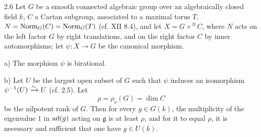 \begin{theorem}{2.6}\label{XIII.2.6}
Let $G$ be a smooth connected algebraic group over an algebraically closed
field $k$, $C$ a Cartan subgroup, associated to a maximal torus $T$,
$N=\operatorname{Norm}_G(C)=\operatorname{Norm}_G(T)$ (cf. XII 8.4), and let $X=G\times^N C$, where
$N$ acts on the left factor $G$ by right translations, and on the right
factor $C$ by inner automorphisms; let $\psi:X\to G$ be the canonical
morphism.

\noindent a) The morphism $\psi$ is birational.

\noindent b) Let $U$ be the largest open subset of $G$ such that $\psi$
induces an isomorphism $\psi^{-1}(U)\xrightarrow{\sim} U$ (cf. 2.5). Let
\[
 \rho=\rho_\nu(G)=\dim C
\]
be the nilpotent rank of $G$. Then for every $g\in G(k)$, the multiplicity
of the eigenvalue $1$ in $\operatorname{ad}(g)$ acting on $\mathfrak g$ is at least
$\rho$, and for it to equal $\rho$, it is necessary and sufficient that
one have $g\in U(k)$.
\end{theorem}
